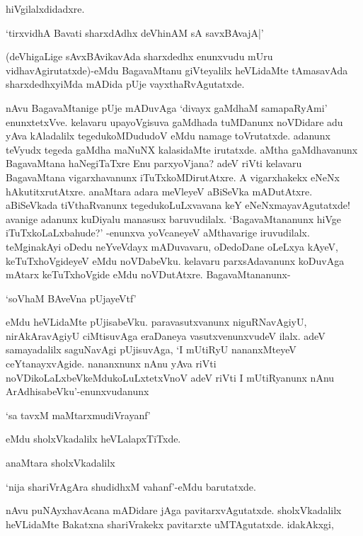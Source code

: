 hiVgilalxdidadxre.

\begin{shloka}
`tirxvidhA Bavati sharxdAdhx deVhinAM sA savxBAvajA|'
\end{shloka} 

(deVhigaLige sAvxBAvikavAda sharxdedhx enunxvudu mUru vidhavAgirutatxde)-eMdu BagavaMtanu giVteyalilx heVLidaMte tAmasavAda sharxdedhxyiMda mADida pUje vayxthaRvAgutatxde.

nAvu BagavaMtanige pUje mADuvAga `divayx gaMdhaM samapaRyAmi' enunxtetxVve. kelavaru upayoVgisuva gaMdhada tuMDanunx noVDidare adu yAva kAladalilx tegedukoMDududoV eMdu namage toVrutatxde. adanunx teVyudx tegeda gaMdha maNuNX kalasidaMte irutatxde. aMtha gaMdhavanunx BagavaMtana haNegiTaTxre Enu parxyoVjana? adeV riVti kelavaru BagavaMtana vigarxhavanunx iTuTxkoMDirutAtxre. A vigarxhakekx eNeNx hAkutitxrutAtxre. anaMtara adara meVleyeV aBiSeVka mADutAtxre. aBiSeVkada tiVthaRvanunx tegedukoLuLxvavana keY eNeNxmayavAgutatxde! avanige adanunx kuDiyalu manasusx baruvudilalx. `BagavaMtananunx hiVge iTuTxkoLaLxbahude?' -enunxva yoVcaneyeV aMthavarige iruvudilalx. teMginakAyi oDedu neYveVdayx mADuvavaru, oDedoDane oLeLxya kAyeV, keTuTxhoVgideyeV eMdu noVDabeVku. kelavaru parxsAdavanunx koDuvAga mAtarx keTuTxhoVgide eMdu noVDutAtxre. BagavaMtananunx-

\begin{shloka}
`soV\s haM BAveVna pUjayeVtf'
\end{shloka}

\noindent eMdu heVLidaMte pUjisabeVku. paravasutxvanunx niguRNavAgiyU, nirAkAravAgiyU ciMtisuvAga eraDaneya vasutxvenunxvudeV ilalx. adeV samayadalilx saguNavAgi pUjisuvAga, `I mUtiRyU nananxMteyeV ceYtanayxvAgide. nananxnunx nAnu yAva riVti noVDikoLaLxbeVkeMdukoLuLxtetxVnoV adeV riVti I mUtiRyanunx nAnu ArAdhisabeVku'-enunxvudanunx

\begin{shloka}
`sa tavxM maMtarxmudiVrayanf'
\end{shloka}

\noindent eMdu sholxVkadalilx heVLalapxTiTxde.

anaMtara sholxVkadalilx 

\begin{shloka}
`nija shariVrAgAra shudidhxM vahanf'-eMdu barutatxde.
\end{shloka}

nAvu puNAyxhavAcana mADidare jAga pavitarxvAgutatxde. sholxVkadalilx heVLidaMte Bakatxna shariVrakekx pavitarxte uMTAgutatxde. idakAkxgi,

